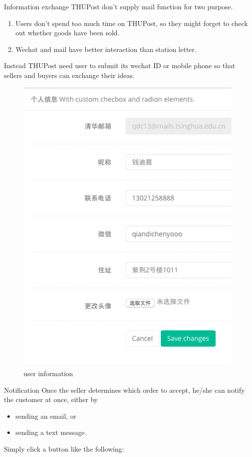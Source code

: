 \documentclass[final]{beamer}
\newlength{\onecolwid}
\begin{document}
\begin{frame}[t]
\begin{columns}[t]
\begin{column}{\onecolwid}
        \begin{block}{Information exchange}
        THUPost don't supply mail function for two purpose. 
        \begin{enumerate}
        \item Users don't spend too much time on THUPost, so they might forget to check out whether goods have been sold.
        \item Wechat and mail have better interaction than station letter.
        \end{enumerate}

        Instead THUPost need user to submit its wechat ID or mobile phone so that sellers and buyers can exchange their ideas.


        \end{block}

        \begin{figure}
        \includegraphics[width=0.4\linewidth]{information.png}
        \caption{user information}
        \end{figure}


        \begin{block}{Notification}
            Once the seller determines which order to accept, he/she can notify the customer at once, either by
            \begin{itemize}
                \item sending an email, or
                \item sending a text message.
            \end{itemize}
            Simply click a button like the following:


\end{block}
\end{column}
\end{columns}
\end{frame}
\end{document}
